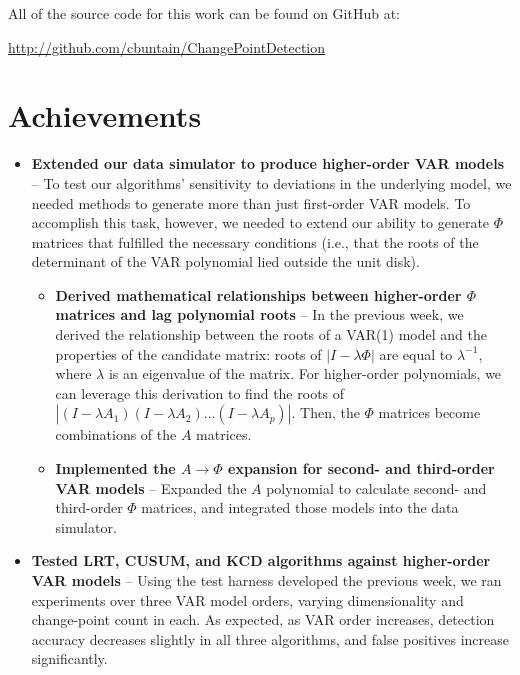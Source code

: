 \documentclass[10pt,letterpaper]{article}
\begin{document}
\maketitle

All of the source code for this work can be found on GitHub at:

\url{http://github.com/cbuntain/ChangePointDetection}

\section{Achievements}

\begin{itemize}
\item \textbf{Extended our data simulator to produce higher-order VAR models} -- To test our algorithms' sensitivity to deviations in the underlying model, we needed methods to generate more than just first-order VAR models. To accomplish this task, however, we needed to extend our ability to generate $\Phi$ matrices that fulfilled the necessary conditions (i.e., that the roots of the determinant of the VAR polynomial lied outside the unit disk).
\begin{itemize}
\item \textbf{Derived mathematical relationships between higher-order $\Phi$ matrices and lag polynomial roots} -- In the previous week, we derived the relationship between the roots of a VAR(1) model and the properties of the candidate matrix: roots of $|I- \lambda \Phi|$ are equal to $\lambda^{-1}$, where $\lambda$ is an eigenvalue of the matrix. For higher-order polynomials, we can leverage this derivation to find the roots of $|(I- \lambda A_1)(I- \lambda A_2)...(I- \lambda A_p)|$. Then, the $\Phi$ matrices become combinations of the $A$ matrices.
\item \textbf{Implemented the $A \rightarrow \Phi$ expansion for second- and third-order VAR models} -- Expanded the $A$ polynomial to calculate second- and third-order $\Phi$ matrices, and integrated those models into the data simulator.
\end{itemize}

\item \textbf{Tested LRT, CUSUM, and KCD algorithms against higher-order VAR models} -- Using the test harness developed the previous week, we ran experiments over three VAR model orders, varying dimensionality and change-point count in each. As expected, as VAR order increases, detection accuracy decreases slightly in all three algorithms, and false positives increase significantly.


\end{itemize}
\end{document}
